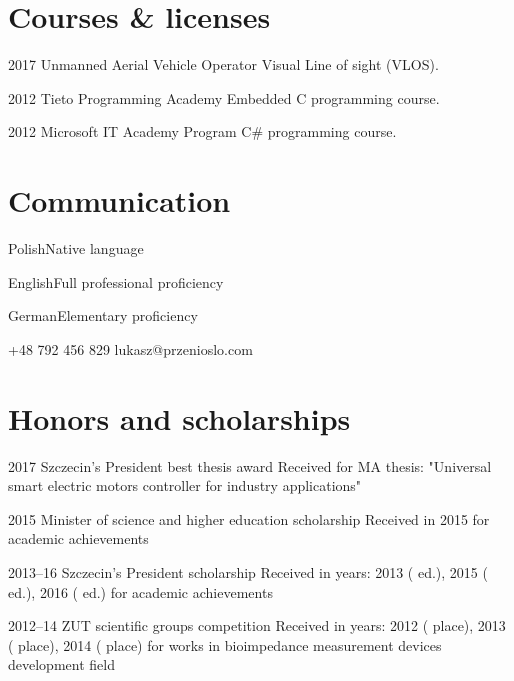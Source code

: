 \documentclass{tccv}
\begin{document}
\section{Courses \& licenses}

\begin{yearlist}

\item{2017}
     {Unmanned Aerial Vehicle Operator}
     {Visual Line of sight (VLOS).}

\item{2012}
     {Tieto Programming Academy}
     {Embedded C programming course.}

\item{2012}
     {Microsoft IT Academy Program }
     {C\# programming course.}

\end{yearlist}

\section{Communication}

\begin{factlist}
\item{Polish}{Native language}
\item{English}{Full professional proficiency}
\item{German}{Elementary proficiency}
\end{factlist}

    {+48 792 456 829}
    {lukasz@przenioslo.com}
    
\section{Honors and scholarships}

\begin{yearlist}

\item{2017}
     {Szczecin's President best thesis award}
     {Received for MA thesis: "Universal smart electric motors controller for industry applications"} 
     
\item{2015}
     {Minister of science and higher education scholarship}
     {Received in 2015 for academic achievements} 
     
\item{2013--16}
     {Szczecin's President scholarship}
     {Received in years: 2013 ( ed.), 2015 ( ed.), 2016 ( ed.) for academic achievements} 

\item{2012--14}
     {ZUT scientific groups competition}
     {Received in years: 2012 ( place), 2013 ( place), 2014 ( place) for works in bioimpedance measurement devices development field} 
    
\end{yearlist}
\end{document}
